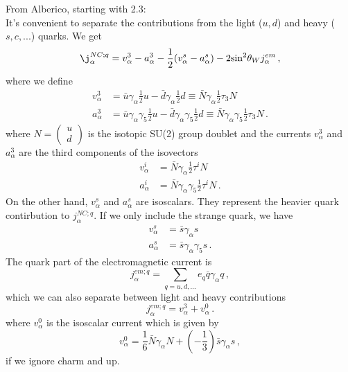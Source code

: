   From Alberico, starting with 2.3: \\
  It's convenient to separate the contributions from the light ($u,d$) and
  heavy ($s,c,...$) quarks. We get
  \[
    \j_{\alpha}^{NC;q} = v_{\alpha}^3 - a_{\alpha}^3 - \frac{1}{2}(v_{\alpha}^s - a_{\alpha}^s) - 2\mathrm{sin}^2\theta_W j_{\alpha}^{em} \,,
  \]
  where we define
  \begin{align*}
      v_{\alpha}^3 &= \bar{u}\gamma_{\alpha}\frac{1}{2}u - \bar{d}\gamma_{\alpha}\frac{1}{2}d \equiv \bar{N} \gamma_{\alpha}\frac{1}{2}\tau_3 N \\
      a_{\alpha}^3 &= \bar{u}\gamma_{\alpha}\gamma_5\frac{1}{2}u - \bar{d}\gamma_{\alpha}\gamma_5\frac{1}{2}d \equiv \bar{N} \gamma_{\alpha}\gamma_5\frac{1}{2}\tau_3 N \,.
  \end{align*}
  where $N = \left(\begin{matrix}{u}\\{d}\end{matrix} \right)$ is the isotopic
  SU(2) group doublet and the currents $v_{\alpha}^3$ and $a_{\alpha}^3$
  are the third components of the isovectors
  \begin{align*}
      v_{\alpha}^i &= \bar{N} \gamma_{\alpha}\frac{1}{2}\tau^i N \\
      a_{\alpha}^i &= \bar{N} \gamma_{\alpha}\gamma_5\frac{1}{2}\tau^i N \,.
  \end{align*}
  On the other hand, $v_{\alpha}^s$ and $a_{\alpha}^s$ are isoscalars. They
  represent the heavier quark contirbution to $j_{\alpha}^{NC;q}$. If we only
  include the strange quark, we have
  \begin{align*}
      v_{\alpha}^s &= \bar{s}\gamma_{\alpha}s \\
      a_{\alpha}^s &= \bar{s}\gamma_{\alpha}\gamma_5 s \,.
  \end{align*}
  The quark part of the electromagnetic current is
  \[
    j_{\alpha}^{em;q} = \sum_{q=u,d,...} e_q\bar{q} \gamma_{\alpha}q \,,
  \]
  which we can also separate between light and heavy contributions
  \[
    j_{\alpha}^{em;q} = v_{\alpha}^3 + v_{\alpha}^0 \,.
  \]
  where $v_{\alpha}^0$ is the isoscalar current which is given by
  \[
    v_{\alpha}^0 = \frac{1}{6}\bar{N}\gamma_{\alpha}N + \left(-\frac{1}{3}\right)\bar{s}\gamma_{\alpha}s \,,
  \]
  if we ignore charm and up.


